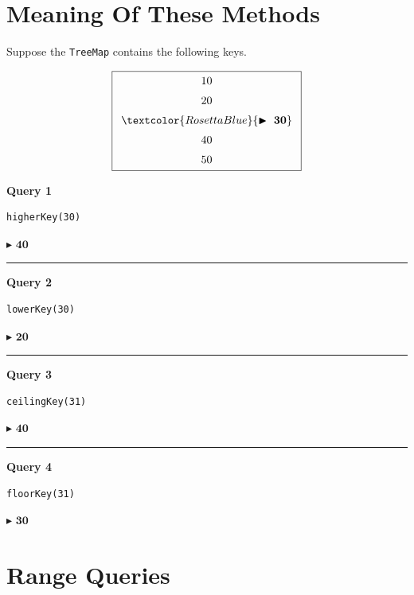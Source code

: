 \documentclass[11pt,a4paper]{book}
\begin{document}


\section{Meaning Of These Methods}

Suppose the \texttt{TreeMap} contains the following keys.

\[
\boxed{
\begin{array}{c}
10\\[2mm]
20\\[2mm]
\textcolor{RosettaBlue}{\blacktriangleright\ \mathbf{30}}\\[2mm]
40\\[2mm]
50
\end{array}
}
\]

\bigskip

\textbf{\textcolor{RosettaBlue}{Query 1}}

\begin{verbatim}
higherKey(30)
\end{verbatim}
$\blacktriangleright$
\textcolor{RosettaDeepGreen}{$\mathbf{40}$}


\medskip
\hrule
\medskip

\textbf{\textcolor{RosettaBlue}{Query 2}}

\begin{verbatim}
lowerKey(30)
\end{verbatim}
$\blacktriangleright$
\textcolor{RosettaDeepGreen}{$\mathbf{20}$}


\medskip
\hrule
\medskip

\textbf{\textcolor{RosettaBlue}{Query 3}}

\begin{verbatim}
ceilingKey(31)
\end{verbatim}
$\blacktriangleright$
\textcolor{RosettaDeepGreen}{$\mathbf{40}$}

\medskip
\hrule
\medskip

\textbf{\textcolor{RosettaBlue}{Query 4}}

\begin{verbatim}
floorKey(31)
\end{verbatim}
$\blacktriangleright$
\textcolor{RosettaDeepGreen}{$\mathbf{30}$}


\section{Range Queries}
\end{document}
